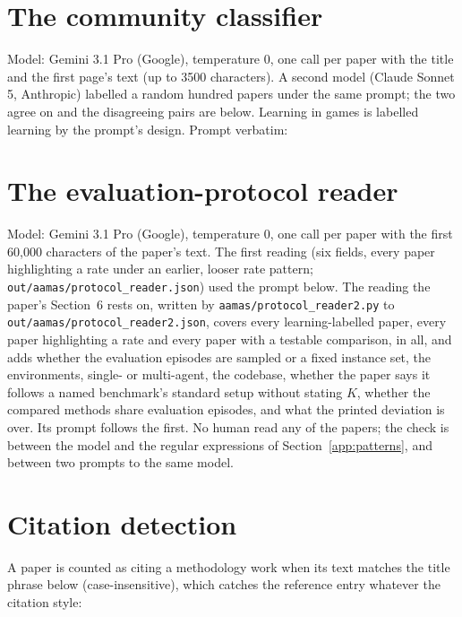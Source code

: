 \documentclass[sigconf,anonymous]{aamas}
\begin{document}
\section{The community classifier}
\label{app:classifier}
Model: Gemini 3.1 Pro (Google), temperature 0, one call per paper with the
title and the first page's text (up to 3500 characters). A second model
(Claude Sonnet 5, Anthropic) labelled a random hundred papers under the
same prompt; the two agree on \nCommAgreeFrac{} and the disagreeing pairs
are below. Learning in games is labelled learning by the prompt's design.
Prompt verbatim:
{\scriptsize}


\section{The evaluation-protocol reader}
\label{app:protocol-reader}
Model: Gemini 3.1 Pro (Google), temperature 0, one call per paper with the
first 60,000 characters of the paper's text. The first reading (six
fields, every paper highlighting a rate under an earlier, looser rate
pattern; \texttt{out/aamas/protocol\_reader.json}) used the prompt below.
The reading the paper's Section~6 rests on, written by
\texttt{aamas/protocol\_reader2.py} to
\texttt{out/aamas/protocol\_reader2.json},
covers every learning-labelled paper, every paper highlighting a rate and
every paper with a testable comparison, \nPtwoPapers{} in all, and adds
whether the evaluation episodes are sampled or a fixed instance set, the
environments, single- or multi-agent, the codebase, whether the paper
says it follows a named benchmark's standard setup without stating $K$,
whether the compared methods share evaluation episodes, and what the
printed deviation is over. Its prompt follows the first. No human read
any of the papers; the check is between the model and the regular
expressions of Section~\ref{app:patterns}, and between two prompts to
the same model.
{\scriptsize}
{\scriptsize}

\section{Citation detection}
\label{app:citations}
A paper is counted as citing a methodology work when its text matches the
title phrase below (case-insensitive), which catches the reference entry
whatever the citation style:
{\scriptsize}
\end{document}
